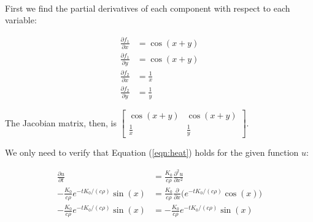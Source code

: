 \item  {}\\ 
First we find the partial derivatives of each component with respect to each
variable:

 \begin{align*}
  \frac{\partial f_1}{\partial x} &= \cos(x + y) \\
  \frac{\partial f_1}{\partial y} &= \cos(x + y) \\
  \frac{\partial f_2}{\partial x} &= \frac{1}{x} \\
  \frac{\partial f_2}{\partial y} &= \frac{1}{y}
 \end{align*}

The Jacobian matrix, then, is
$\begin{bmatrix}
 \cos(x + y) & \cos(x + y) \\ \frac{1}{x} & \frac{1}{y}
\end{bmatrix}$.
\item {}

We only need to verify that Equation (\ref{eqn:heat}) holds for the given function $u$:

\begin{align*}
 \frac{\partial u}{\partial t} &= \frac{K_0}{c\rho} \frac{\partial^2 u}{\partial x^2} \\
 -\frac{K_0}{c\rho}e^{-tK_0/(c\rho)}\sin(x) &=
 \frac{K_0}{c\rho}\frac{\partial}{\partial x}\Big(e^{-tK_0/(c\rho)}\cos(x)\Big) \\
 -\frac{K_0}{c\rho}e^{-tK_0/(c\rho)}\sin(x) &=
 -\frac{K_0}{c\rho}e^{-tK_0/(c\rho)}\sin(x)
\end{align*}

